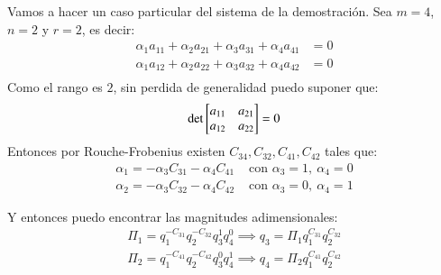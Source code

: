 \begin{eg}
    Vamos a hacer un caso particular del sistema de la demostración. Sea $m=4$, $n=2$ y $r=2$, es decir:
    \begin{align*}
        \alpha_1 a_{11} + \alpha_2 a_{21} + \alpha_3 a_{31} + \alpha_4 a_{41} &= 0\\
        \alpha_1 a_{12} + \alpha_2 a_{22} + \alpha_3 a_{32} + \alpha_4 a_{42} &= 0\\
    \end{align*}
    Como el rango es $2$, sin perdida de generalidad puedo suponer que:
    $$
        \det \mx{a_{11} & a_{21}\\
                 a_{12} & a_{22}} = 0
    $$
    Entonces por Rouche-Frobenius existen $C_{34}, C_{32}, C_{41}, C_{42}$ tales que:
    \begin{align*}
        \alpha_1 = - \alpha_3 C_{31} - \alpha_4 C_{41} &\text{ con } \alpha_3 = 1,\ \alpha_4=0\\
        \alpha_2 = - \alpha_3 C_{32} - \alpha_4 C_{42} &\text{ con } \alpha_3 = 0,\ \alpha_4=1
    \end{align*}

    Y entonces puedo encontrar las magnitudes adimensionales:
    \begin{align*}
        \Pi_1 = q_1^{-C_{31}} q_2^{-C_{32}} q_3^{1} q_4^{0} \implies q_3 = \Pi_1 q_1^{C_{31}} q_2^{C_{32}}\\
        \Pi_2 = q_1^{-C_{41}} q_2^{-C_{42}} q_3^{0} q_4^{1} \implies q_4 = \Pi_2 q_1^{C_{41}} q_2^{C_{42}}
    \end{align*}


\end{eg}
